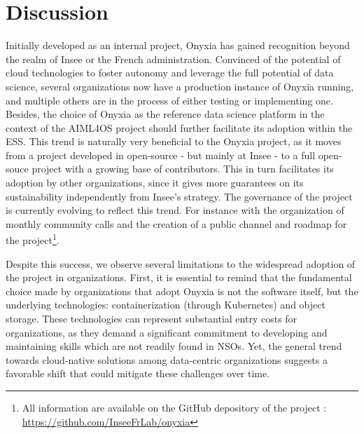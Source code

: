 \section{Discussion}


Initially developed as an internal project, Onyxia has gained recognition beyond the realm of Insee or the French administration. Convinced of the potential of cloud technologies to foster autonomy and leverage the full potential of data science, several organizations now have a production instance of Onyxia running, and multiple others are in the process of either testing or implementing one. Besides, the choice of Onyxia as the reference data science platform in the context of the AIML4OS project should further facilitate its adoption within the ESS. This trend is naturally very beneficial to the Onyxia project, as it moves from a project developed in open-source - but mainly at Insee - to a full open-souce project with a growing base of contributors. This in turn facilitates its adoption by other organizations, since it gives more guarantees on its sustainability independently from Insee's strategy. The governance of the project is currently evolving to reflect this trend. For instance with the organization of monthly community calls and the creation of a public channel and roadmap for the project\footnote{All information are available on the GitHub depository of the project : \url{https://github.com/InseeFrLab/onyxia}}.

Despite this success, we observe several limitations to the widespread adoption of the project in organizations. First, it is essential to remind that the fundamental choice made by organizations that adopt Onyxia is not the software itself, but the underlying technologies: containerization (through Kubernetes) and object storage. These technologies can represent substantial entry costs for organizations, as they demand a significant commitment to developing and maintaining skills which are not readily found in NSOs. Yet, the general trend towards cloud-native solutions among data-centric organizations suggests a favorable shift that could mitigate these challenges over time.

